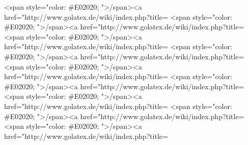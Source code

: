 <span style="color: #E02020; ">\</span><a href="http://www.golatex.de/wiki/index.php?title=%
<span style="color: #E02020; ">\</span><a href="http://www.golatex.de/wiki/index.php?title=%
<span style="color: #E02020; ">\</span><a href="http://www.golatex.de/wiki/index.php?title=%
<span style="color: #E02020; ">\</span><a href="http://www.golatex.de/wiki/index.php?title=%
<span style="color: #E02020; ">\</span><a href="http://www.golatex.de/wiki/index.php?title=%
<span style="color: #E02020; ">\</span><a href="http://www.golatex.de/wiki/index.php?title=%
<span style="color: #E02020; ">\</span><a href="http://www.golatex.de/wiki/index.php?title=%
<span style="color: #E02020; ">\</span><a href="http://www.golatex.de/wiki/index.php?title=%
<span style="color: #E02020; ">\</span><a href="http://www.golatex.de/wiki/index.php?title=%
